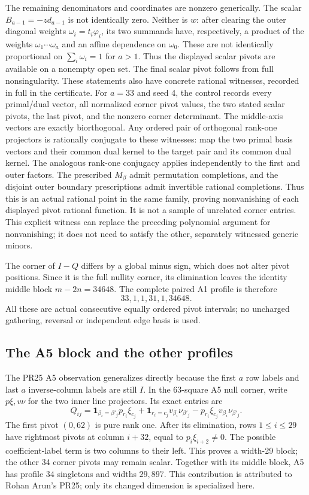 The remaining denominators and coordinates are nonzero generically.
The scalar $B_{a-1}=-z d_{a-1}$ is not identically zero. Neither is $w$:
after clearing the outer diagonal weights $\omega_i=t_i\varphi_i$,
its two summands have, respectively, a product of the weights
$\omega_1\cdots\omega_a$ and an affine dependence on $\omega_0$.
These are not identically proportional on $\sum_i\omega_i=1$ for $a>1$.
Thus the displayed scalar pivots are available on a nonempty open set.
The final scalar pivot follows from full nonsingularity. These statements
also have concrete rational witnesses, recorded in full in the certificate.
For $a=33$ and seed 4, the control records every primal/dual vector, all
normalized corner pivot values, the two stated scalar pivots, the last
pivot, and the nonzero corner determinant. The middle-axis vectors are
exactly biorthogonal. Any ordered pair of orthogonal rank-one projectors
is rationally conjugate to these witnesses: map the two primal basis
vectors and their common dual kernel to the target pair and its common
dual kernel. The analogous rank-one conjugacy applies independently to
the first and outer factors. The prescribed $M_\beta$ admit permutation
completions, and the disjoint outer boundary prescriptions admit invertible
rational completions. Thus this is an actual rational point in the same
family, proving nonvanishing of each displayed pivot rational function.
It is not a sample of unrelated corner entries. This explicit witness
can replace the preceding polynomial argument for nonvanishing; it does
not need to satisfy the other, separately witnessed generic minors.

The corner of $I-Q$ differs by a global minus sign, which does not alter
pivot positions. Since it is the full nullity corner, its elimination
leaves the identity middle block $m-2n=34648$. The complete paired A1
profile is therefore
\[
 \boxed{33,1,1,31,1,34648}.
\]
All these are actual consecutive equally ordered pivot intervals; no
uncharged gathering, reversal or independent edge basis is used.

\subsection{The A5 block and the other profiles}
The PR25 A5 observation generalizes directly because the first $a$ row
labels and last $a$ inverse-column labels are still $I$.
In the 63-square A5 null corner, write $p\xi,v\nu$ for the two inner
line projectors. Its exact entries are
\[
 Q_{ij}=\mathbf1_{\beta_i=\beta'_j}p_{r_i}\xi_{c_j}
 +\mathbf1_{r_i=c_j}v_{\beta_i}\nu_{\beta'_j}
 -p_{r_i}\xi_{c_j}v_{\beta_i}\nu_{\beta'_j}.
\]
The first pivot $(0,62)$ is pure rank one. After its elimination, rows
$1\le i\le29$ have rightmost pivots at column $i+32$, equal to
$p_i\xi_{i+2}\ne0$. The possible coefficient-label term is two columns
to their left. This proves a width-29 block; the other 34 corner pivots
may remain scalar. Together with its middle block, A5 has profile
$34$ singletons and widths $29,897$. This contribution is attributed to
Rohan Arun's PR25; only its changed dimension is specialized here.

